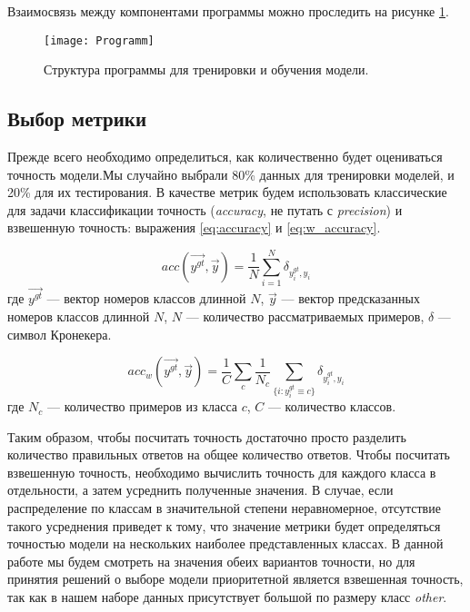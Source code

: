  \indent
 \indent
 Взаимосвязь между компонентами программы можно проследить на 
  рисунке \ref{tikzpicture: programm}.

\begin{figure}[h!]
    \begin{center}
   	    \texttt{[image: Programm]}
   	\end{center}
   	\caption{Структура программы для тренировки и обучения модели.}
   	\label{tikzpicture: programm}
\end{figure}


\subsection{Выбор метрики}

\indent
\indent
Прежде всего необходимо определиться, как количественно будет оцениваться
точность модели.Мы случайно выбрали 80\% данных 
для тренировки моделей, и 
20\% для их тестирования. В качестве метрик будем использовать 
классические для задачи классификации точность
 (\textit{accuracy}, не путать с \textit{precision}) и взвешенную точность:
выражения \ref{eq:accuracy} и \ref{eq:w_accuracy}.


\begin{equation}\label{eq:accuracy}
	   acc(\vec{y^{gt}}, \vec{y}) = \frac{1}{N}\sum_{i=1}^{N} \delta_{y_i^{gt}, y_i}
\end{equation}
где $\vec{y^{gt}}$ --- вектор номеров классов длинной $N$, 
$\vec{y}$ --- вектор предсказанных номеров классов длинной $N$,
$N$ --- количество рассматриваемых примеров,
$\delta$ --- символ Кронекера.

\begin{equation}\label{eq:w_accuracy}
	   acc_w(\vec{y^{gt}}, \vec{y}) = 
	   \frac{1}{C} \sum_{c}
	   \frac{1}{N_c}\sum_{\{i: y_i^{gt}\equiv c\}} \delta_{y_i^{gt}, y_i}
\end{equation}
где $N_c$ --- количество примеров из класса $c$, $C$ --- количество классов.
 

\indent
\indent
Таким образом, чтобы посчитать точность достаточно просто разделить
количество правильных ответов на общее количество ответов. Чтобы посчитать
взвешенную точность, необходимо вычислить точность для каждого класса
в отдельности, а затем усреднить полученные значения. В случае, если распределение
по классам в значительной степени неравномерное, отсутствие такого усреднения
приведет к тому, что значение метрики будет определяться точностью модели на
нескольких наиболее представленных классах. В данной работе мы будем
смотреть на значения обеих вариантов точности, но для принятия
решений о выборе модели приоритетной является взвешенная точность, так как в нашем наборе данных присутствует большой по размеру класс \textit{other}.


